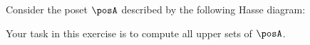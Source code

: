 \begin{gradedexercise}
    \label{ex:UpperSetsOfPreferences}

    Consider the poset $\posA$ described by the following Hasse diagram:
    \begin{center}
    \end{center}
    Your task in this exercise is to compute all upper sets of $\posA$.
\end{gradedexercise}

